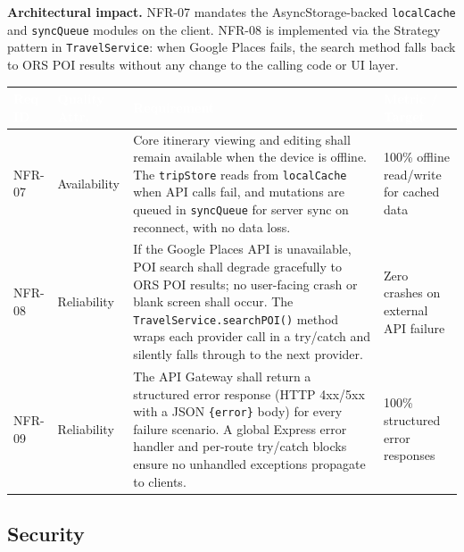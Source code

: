 \documentclass[12pt, a4paper]{article}
\newcommand{\reqid}[1]{\textsc{\small #1}}
\newcommand{\thcell}[1]{\textcolor{white}{\textbf{\small #1}}}
\begin{document}
\begin{tcolorbox}[notebox]
  \textbf{Architectural impact.} NFR-07 mandates the AsyncStorage-backed \texttt{localCache} and \texttt{syncQueue} modules on the client. NFR-08 is implemented via the Strategy pattern in \texttt{TravelService}: when Google Places fails, the search method falls back to ORS POI results without any change to the calling code or UI layer.
\end{tcolorbox}

\vspace{0.4em}
\begin{longtable}{C{1.5cm} C{2.4cm} L{7.0cm} C{2.7cm}}
\toprule
{}
\thcell{Req ID} & \thcell{Quality Attr.} & \thcell{Requirement} & \thcell{Metric / Target} \\
\midrule
\endhead
\bottomrule
\endfoot

\reqid{NFR-07} & Availability &
Core itinerary viewing and editing shall remain available when the device is offline. The \texttt{tripStore} reads from \texttt{localCache} when API calls fail, and mutations are queued in \texttt{syncQueue} for server sync on reconnect, with no data loss. &
100\% offline read/write for cached data \\

\reqid{NFR-08} & Reliability &
If the Google Places API is unavailable, POI search shall degrade gracefully to ORS POI results; no user-facing crash or blank screen shall occur. The \texttt{TravelService.searchPOI()} method wraps each provider call in a try/catch and silently falls through to the next provider. &
Zero crashes on external API failure \\

\reqid{NFR-09} & Reliability &
The API Gateway shall return a structured error response (HTTP 4xx/5xx with a JSON \texttt{\{error\}} body) for every failure scenario. A global Express error handler and per-route try/catch blocks ensure no unhandled exceptions propagate to clients. &
100\% structured error responses \\

\end{longtable}

\subsection{Security}
\end{document}
